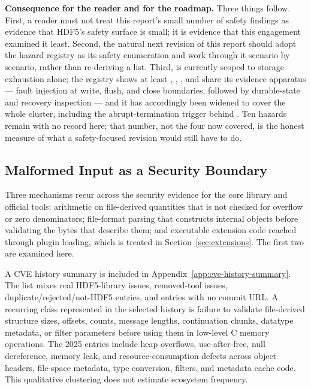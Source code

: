 \documentclass[../main.tex]{subfiles}
\begin{document}
\noindent\textbf{Consequence for the reader and for the roadmap.}
Three things follow. First, a reader must not treat this report's small number
of safety findings as evidence that HDF5's safety surface is small; it is
evidence that this engagement examined it least. Second, the natural next
revision of this report should adopt the hazard registry as its safety
enumeration and work through it scenario by scenario, rather than re-deriving a
list. Third,  is currently scoped to storage exhaustion alone; the
registry shows at least , , , and
 share its evidence apparatus --- fault injection at write,
flush, and close boundaries, followed by durable-state and recovery inspection
--- and it has accordingly been widened to cover the whole cluster, including
the abrupt-termination trigger behind . Ten hazards remain
with no record here; that number, not the four now covered, is the honest
measure of what a safety-focused revision would still have to do.

\subsection{Malformed Input as a Security Boundary}

Three mechanisms recur across the security evidence for the core library and
official tools: arithmetic on file-derived quantities that is not checked for
overflow or zero denominators; file-format parsing that constructs internal
objects before validating the bytes that describe them; and executable
extension code reached through plugin loading, which is treated in
Section~\ref{sec:extensions}. The first two are examined here.

A CVE history summary is included in Appendix~\ref{app:cve-history-summary}.
The list mixes real HDF5-library issues, removed-tool issues,
duplicate/rejected/not-HDF5 entries, and entries with no commit URL.
A recurring class represented in the selected history is failure to validate
file-derived structure sizes, offsets, counts, message lengths, continuation
chunks, datatype metadata, or filter parameters before using them in low-level
C memory operations. The 2025 entries include heap overflows, use-after-free,
null dereference, memory leak, and resource-consumption defects across object
headers, file-space metadata, type conversion, filters, and metadata cache
code. This qualitative clustering does not estimate ecosystem frequency.
\end{document}
